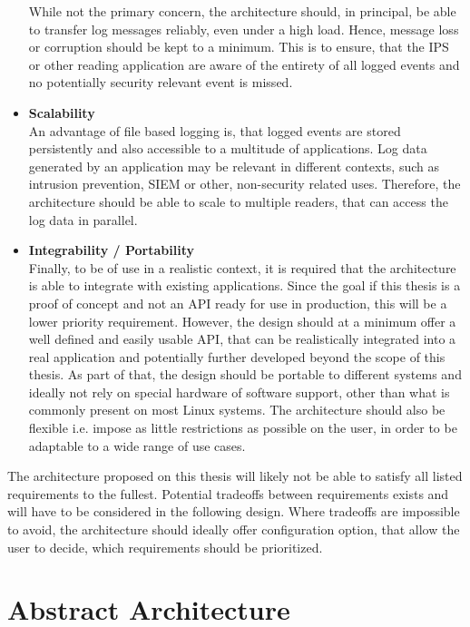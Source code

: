 \begin{itemize}
    While not the primary concern, the architecture should, in principal, be able to transfer log messages reliably, even under a high load. Hence, message loss or corruption 
    should be kept to a minimum. This is to ensure, that the \ac{IPS} or other reading application are aware of the entirety of all logged events and no potentially security relevant event is missed. 
    \item \textbf{Scalability} \\
    An advantage of file based logging is, that logged events are stored persistently and also accessible to a multitude of applications. Log data generated by an application may be relevant in different
    contexts, such as intrusion prevention, \ac{SIEM} or other, non-security related uses. Therefore, the architecture should be able to scale to multiple readers, that can access the log data in parallel. 
    \item \textbf{Integrability / Portability} \\
    Finally, to be of use in a realistic context, it is required that the architecture is able to integrate with existing applications. Since the goal if this thesis is a proof of concept and not an 
    API ready for use in production, this will be a lower priority requirement. However, the design should at a minimum offer a well defined and easily usable API, that can be realistically integrated into a real application
    and potentially further developed beyond the scope of this thesis. As part of that, the design should be portable to different systems and ideally not rely on special hardware of software support, other than what
    is commonly present on most Linux systems. The architecture should also be flexible i.e. impose as little restrictions as possible on the user, in order to be adaptable to a wide range of use cases.  

\end{itemize}

The architecture proposed on this thesis will likely not be able to satisfy all listed requirements to the fullest. Potential tradeoffs between requirements exists and will have to be considered in the following
design. Where tradeoffs are impossible to avoid, the architecture should ideally offer configuration option, that allow the user to decide, which requirements should be prioritized.       

\section{Abstract Architecture}

